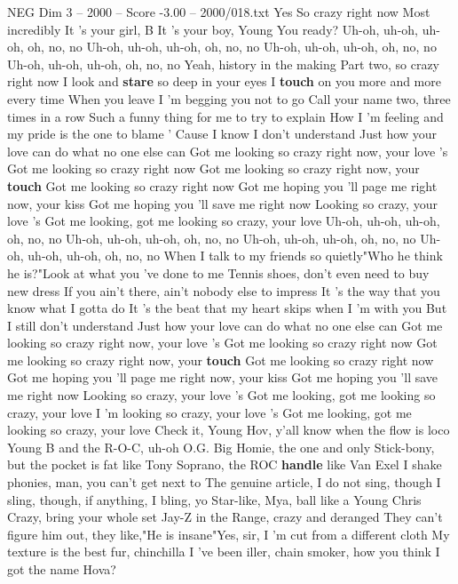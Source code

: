\begin{textsample}{NEG Dim 3 – 2000 – Score -3.00 – 2000/018.txt}  \label{ex:f3_neg_003}
Yes So crazy right now Most incredibly It 's your girl, B It 's your boy, Young You ready?
Uh-oh, uh-oh, uh-oh, oh, no, no Uh-oh, uh-oh, uh-oh, oh, no, no Uh-oh, uh-oh, uh-oh, oh, no, no Uh-oh, uh-oh, uh-oh, oh, no, no Yeah, history in the making Part two, so crazy right now I look and \textbf{stare} so deep in your eyes I \textbf{touch} on you more and more every time When you leave I 'm begging you not to go Call your name two, three times in a row Such a funny thing for me to try to explain How I 'm feeling and my pride is the one to blame ' Cause I know I don't understand Just how your love can do what no one else can Got me looking so crazy right now, your love 's Got me looking so crazy right now Got me looking so crazy right now, your \textbf{touch} Got me looking so crazy right now Got me hoping you 'll page me right now, your kiss Got me hoping you 'll save me right now Looking so crazy, your love 's Got me looking, got me looking so crazy, your love Uh-oh, uh-oh, uh-oh, oh, no, no Uh-oh, uh-oh, uh-oh, oh, no, no Uh-oh, uh-oh, uh-oh, oh, no, no Uh-oh, uh-oh, uh-oh, oh, no, no When I talk to my friends so quietly"Who he think he is?"Look at what you 've done to me Tennis shoes, don't even need to buy new dress If you ain't there, ain't nobody else to impress It 's the way that you know what I gotta do It 's the beat that my heart skips when I 'm with you But I still don't understand Just how your love can do what no one else can Got me looking so crazy right now, your love 's Got me looking so crazy right now Got me looking so crazy right now, your \textbf{touch} Got me looking so crazy right now Got me hoping you 'll page me right now, your kiss Got me hoping you 'll save me right now Looking so crazy, your love 's Got me looking, got me looking so crazy, your love I 'm looking so crazy, your love 's Got me looking, got me looking so crazy, your love Check it, Young Hov, y'all know when the flow is loco Young B and the R-O-C, uh-oh O.G.
Big Homie, the one and only Stick-bony, but the pocket is fat like Tony Soprano, the ROC \textbf{handle} like Van Exel I shake phonies, man, you can't get next to The genuine article, I do not sing, though I sling, though, if anything, I bling, yo Star-like, Mya, ball like a Young Chris Crazy, bring your whole set Jay-Z in the Range, crazy and deranged They can't figure him out, they like,"He is insane"Yes, sir, I 'm cut from a different cloth My texture is the best fur, chinchilla I 've been iller, chain smoker, how you think I got the name Hova?

\end{textsample}
